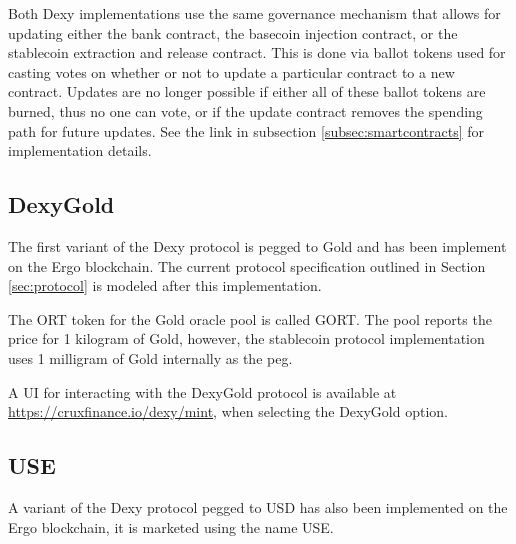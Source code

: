 \documentclass{ifcolog}
\newcommand{\bc}{ERG}
\newcommand{\dxg}{DexyGold}
\newcommand{\dxusd}{USE}
\begin{document}
Both Dexy implementations use the same governance mechanism that allows for updating either the bank contract, 
the basecoin injection contract, or the stablecoin extraction and release contract. This is done via ballot tokens used 
for casting votes on whether or not to update a particular contract to a new contract. Updates are no longer possible if either all 
of these ballot tokens are burned, thus no one can vote, or if the update contract removes the spending path for future updates.
See the link in subsection \ref{subsec:smartcontracts} for implementation details.

\subsection{\dxg}
\label{subsec:dexygold}

The first variant of the Dexy protocol is pegged to Gold and has been implement on the Ergo blockchain. The current protocol 
specification outlined in Section \ref{sec:protocol} is modeled after this implementation.

The ORT token for the Gold oracle pool is called GORT. The pool reports the price for 1 kilogram of Gold, however, 
the stablecoin protocol implementation uses 1 milligram of Gold internally as the peg.



A UI for interacting with the \dxg{} protocol is available at \url{https://cruxfinance.io/dexy/mint}, 
when selecting the DexyGold option.


\subsection{\dxusd}
\label{subsec:dexyusd}

A variant of the Dexy protocol pegged to USD has also been implemented on the Ergo blockchain, it is marketed using the name USE.
\end{document}
